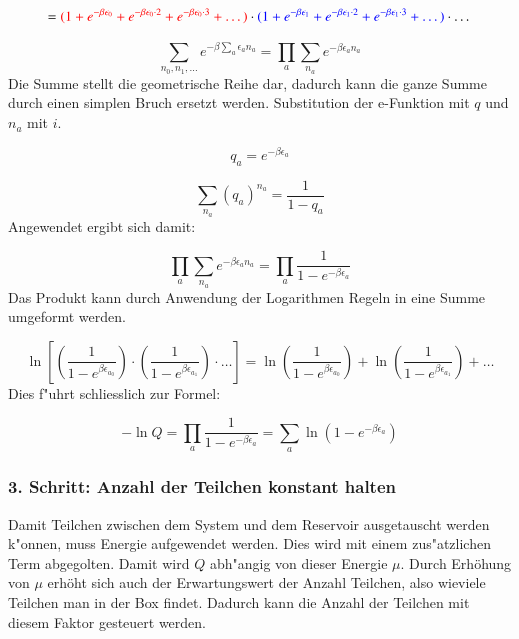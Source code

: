 \begin{refsection}
\begin{equation*}
= \textcolor{red} {(1+e^{- \beta \epsilon_0 }+e^{- \beta \epsilon_0 \cdot 2  }+e^{- \beta \epsilon_0 \cdot 3  }+ \dots)} \cdot \textcolor{blue} {(1+e^{- \beta \epsilon_1 }+e^{- \beta \epsilon_1 \cdot 2  }+e^{- \beta \epsilon_1 \cdot 3  }+ \dots)} \cdot \dots
\end{equation*}

\begin{equation}
\sum\limits_{n_0, n_1, \dots} e^{- \beta \sum_a \epsilon_a n_a } = \prod_{a} \sum_{n_a} e^{- \beta \epsilon_a n_a }
\end{equation}
Die Summe stellt die geometrische Reihe dar, dadurch kann die ganze Summe durch einen simplen Bruch ersetzt werden. Substitution der e-Funktion mit $q$ und $n_a$ mit $i$.

\begin{equation}
q_a = e^{- \beta \epsilon_a}
\end{equation}

\begin{equation}
\sum_{n_a} (q_a)^{n_a} = \frac {1}{1-q_a}
\end{equation}
Angewendet ergibt sich damit:

\begin{equation}
    \prod_{a} \sum_{n_a} e^{- \beta \epsilon_a n_a } = \prod_{a} \frac {1}{1-e^{- \beta \epsilon_a}}
\end{equation}
Das Produkt kann durch Anwendung der Logarithmen Regeln in eine Summe umgeformt werden.

\begin{equation}
\ln \left[ \left( \frac{1}{1-e^{\beta \epsilon_{a_0}}} \right) \cdot \left( \frac{1}{1-e^{ \beta \epsilon_{a_1}}} \right) \cdot \dots \right] = \ln \left( \frac{1}{1-e^{\beta \epsilon_{a_0}}} \right) + \ln \left( \frac{1}{1-e^{\beta \epsilon_{a_1}}} \right) + \dots
\end{equation}
Dies f"uhrt schliesslich zur Formel:

\begin{equation}
- \ln Q = \prod_{a} \frac {1}{1-e^{- \beta \epsilon_a}} = \sum_{a} \ln \left( 1-e^{- \beta \epsilon_a} \right)
\end{equation}

\subsubsection{3. Schritt: Anzahl der Teilchen konstant halten}

Damit Teilchen zwischen dem System und dem Reservoir ausgetauscht werden k"onnen, muss Energie aufgewendet werden.
Dies wird mit einem zus"atzlichen Term abgegolten. Damit wird $Q$ abh"angig von dieser Energie $\mu$. Durch Erhöhung von $\mu$ erhöht sich auch der Erwartungswert der Anzahl Teilchen, also wieviele Teilchen man in der Box findet. Dadurch kann die Anzahl der Teilchen mit diesem Faktor gesteuert werden. \cite{bose:feynman}



\end{refsection}
